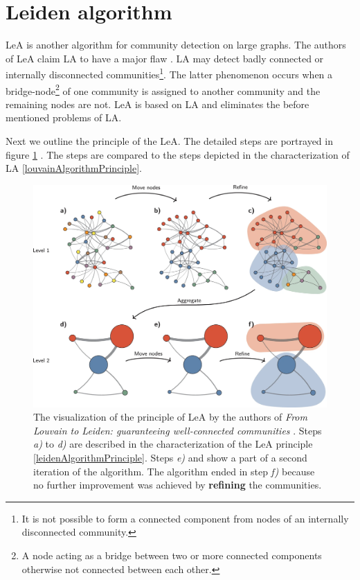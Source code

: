 \section{Leiden algorithm} \label{leidenAlgorithm}
 LeA is another algorithm for community detection on large graphs. The authors of LeA claim LA to have a major flaw \cite{leidenAlgorithm}. LA may detect badly connected or internally disconnected communities\footnote{It is not possible to form a connected component from nodes of an internally disconnected community.}. The latter phenomenon occurs when a bridge-node\footnote{A node acting as a bridge between two or more connected components otherwise not connected between each other.} of one community is assigned to another community and the remaining nodes are not. LeA is based on LA and eliminates the before mentioned problems of LA. 

Next we outline the principle of the LeA. The detailed steps are portrayed in figure \ref{leidenVisualization} \cite{leidenVisualization}. The steps are compared to the steps depicted in the characterization of LA \ref{louvainAlgorithmPrinciple}. 
\begin{figure}[ht!]
  \centering
  \includegraphics[width=\textwidth]{Images/leidenVisualization.png}
  \caption{The visualization of the principle of LeA \cite{leidenVisualization} by the authors of \textit{From Louvain to Leiden: guaranteeing well-connected communities} \cite{leidenAlgorithm}. Steps \textit{a)} to \textit{d)} are described in the characterization of the LeA principle \ref{leidenAlgorithmPrinciple}. Steps \textit{e)} and  show a part of a second iteration of the algorithm. The algorithm ended in step \textit{f)} because no further improvement was achieved by \textbf{refining} the communities.}
  \label{leidenVisualization}
\end{figure}    
 
